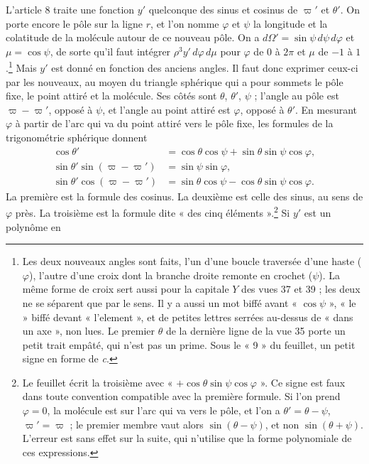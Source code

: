 \documentclass[11pt,a4paper]{article}
\begin{document}
L'article 8 traite une fonction \(y'\) quelconque des sinus et cosinus de
\(\varpi'\) et \(\theta'\). On porte encore le pôle sur la ligne \(r\), et
l'on nomme \(\varphi\) et \(\psi\) la longitude et la colatitude de la
molécule autour de ce nouveau pôle. On a
\(d\Omega'=\sin\psi\,d\psi\,d\varphi\) et \(\mu=\cos\psi\), de sorte qu'il
faut intégrer \(\rho^3y'\,d\varphi\,d\mu\) pour \(\varphi\) de \(0\) à
\(2\pi\) et \(\mu\) de \(-1\) à \(1\).\footnote{Les deux nouveaux angles sont
faits, l'un d'une boucle traversée d'une haste (\(\varphi\)), l'autre d'une
croix dont la branche droite remonte en crochet (\(\psi\)). La même forme de
croix sert aussi pour la capitale \(Y\) des vues 37 et 39 ; les deux ne se
séparent que par le sens. Il y a aussi un mot biffé avant « \(\cos\psi\) »,
« le » biffé devant « l'element », et de petites lettres serrées au-dessus de
« dans un axe », non lues. Le premier \(\theta\) de la dernière ligne de la
vue 35 porte un petit trait empâté, qui n'est pas un prime. Sous le « 9 » du
feuillet, un petit signe en forme de \emph{c}.} Mais \(y'\) est donné en
fonction des anciens angles. Il faut donc exprimer ceux-ci par les nouveaux, au
moyen du triangle sphérique qui a pour sommets le pôle fixe, le point attiré
et la molécule. Ses côtés sont \(\theta\), \(\theta'\), \(\psi\) ; l'angle au
pôle est \(\varpi-\varpi'\), opposé à \(\psi\), et l'angle au point attiré
est \(\varphi\), opposé à \(\theta'\). En mesurant \(\varphi\) à partir de
l'arc qui va du point attiré vers le pôle fixe, les formules de la
trigonométrie sphérique donnent
\[
\begin{aligned}
\cos\theta'&=\cos\theta\cos\psi+\sin\theta\sin\psi\cos\varphi,\\
\sin\theta'\sin(\varpi-\varpi')&=\sin\psi\sin\varphi,\\
\sin\theta'\cos(\varpi-\varpi')&=\sin\theta\cos\psi-\cos\theta\sin\psi\cos\varphi .
\end{aligned}
\]
La première est la formule des cosinus. La deuxième est celle des sinus, au
sens de \(\varphi\) près. La troisième est la formule dite « des cinq
éléments ».\footnote{Le feuillet écrit la troisième avec
« \(+\cos\theta\sin\psi\cos\varphi\) ». Ce signe est faux dans toute
convention compatible avec la première formule. Si l'on prend \(\varphi=0\),
la molécule est sur l'arc qui va vers le pôle, et l'on a \(\theta'=\theta-\psi\),
\(\varpi'=\varpi\) ; le premier membre vaut alors \(\sin(\theta-\psi)\), et non
\(\sin(\theta+\psi)\). L'erreur est sans effet sur la suite, qui n'utilise que
la forme polynomiale de ces expressions.} Si \(y'\) est un polynôme en
\end{document}
